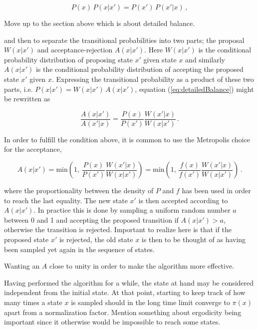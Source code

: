 \documentclass[12pt]{report}
\newcommand{\todo}[1]{{\leavevmode\color{todo}#1}}
\begin{document}
\begin{equation}
	\label{eq:detailedBalance}
	P(x) \, P(x|x') = P(x') \, P(x'|x) \,,
\end{equation}

\todo{Move up to the section above which is about detailed balance.}

and then to separate the transitional probabilities into two parts; the proposal $ W(x|x') $ and acceptance-rejection $ A(x|x') $. Here $ W(x|x') $ is the conditional probability distribution of proposing state $ x' $ given state $ x $ and similarly $ A(x|x') $ is the conditional probability distribution of accepting the proposed state $ x' $ given $ x $. Expressing the transitional probability as a product of these two parts, i.e. $ P(x|x') = W(x|x') \, A(x|x') $, equation (\ref{eq:detailedBalance}) might be rewritten as

\begin{equation}
	\frac{A(x|x')}{A(x'|x)} = \frac{P(x)}{P(x')} \frac{W(x'|x)}{W(x|x')} \,.
\end{equation}

In order to fulfill the condition above, it is common to use the Metropolis choice for the acceptance,

\begin{equation}
	\label{eq:acceptanceRatio}
	A(x|x')
	= \text{min}\left( 1, \, \frac{P(x)}{P(x')} \frac{W(x'|x)}{W(x|x')} \right)
	= \text{min}\left( 1, \, \frac{f(x)}{f(x')} \frac{W(x'|x)}{W(x|x')} \right) \,.
\end{equation}

where the proportionality between the density of $ P $ and $ f $ has been used in order to reach the last equality. The new state $ x' $ is then accepted according to $ A(x|x') $. In practice this is done by sampling a uniform random number $ a $ between 0 and 1 and accepting the proposed transition if $ A(x|x') > a $, otherwise the transition is rejected. Important to realize here is that if the proposed state $ x' $ is rejected, the old state $ x $ is then to be thought of as having been sampled yet again in the sequence of states.

\todo{Wanting an $ A $ close to unity in order to make the algorithm more effective.}

Having performed the algorithm for a while, the state at hand may be considered independent from the initial state. At that point, starting to keep track of how many times a state $ x $ is sampled should in the long time limit converge to $ \pi(x) $ apart from a normalization factor. \todo{Mention something about ergodicity being important since it otherwise would be impossible to reach some states.}
\end{document}
